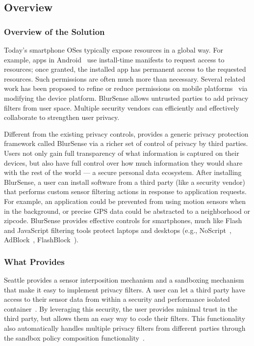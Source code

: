 \subsection{\blurname Overview} 

\subsubsection{Overview of the Solution}

Today's smartphone OSes typically expose resources in a global way. 
For example, apps in Android~\cite{android-os} use 
install-time manifests to request access to resources; once granted,  
the installed app has permanent access to the requested resources.  
Such permissions are often much more than necessary. Several related work has 
been proposed to refine or reduce permissions on mobile
platforms~\cite{hornyack2011these, zhou2011taming, conti2011crepe,
pearce2012addroid} via modifying the device platform. BlurSense allows untrusted
parties to add privacy filters from user space.  Multiple security vendors can
efficiently and effectively collaborate to strengthen user privacy.

Different from the existing privacy controls, \blurname provides a generic
privacy protection framework called BlurSense via a richer set of control of
privacy by third parties. Users not only gain full transparency of what
information is captured on their devices, but also have full control over how
much information they would share with the rest of the world --- a secure
personal data ecosystem. After installing BlurSense, a user can install software
from a third party (like a security vendor) that performs custom sensor
filtering actions in response to application requests. For example, an
application could be prevented from using motion sensors when in the background,
or precise GPS data could be abstracted to a neighborhood or zipcode. BlurSense
provides effective controls for smartphones, much like Flash and JavaScript
filtering tools protect laptops and desktops (e.g., NoScript~\cite{noscript},
AdBlock~\cite{adblock}, FlashBlock~\cite{Flashblock}). 


\subsubsection{What \blurname Provides}

Seattle provides a sensor interposition mechanism and a sandboxing mechanism
that make it easy to implement privacy filters. A user can let a third party
have access to their sensor data from within a security and performance isolated
container~\cite{Cappos_CCS_10}.   By leveraging this security, the user provides
minimal trust in the third party, but allows them an easy way to code their
filters.   This functionality also automatically handles multiple privacy
filters from different parties through the sandbox policy composition
functionality~\cite{Cappos_CCS_10}.


